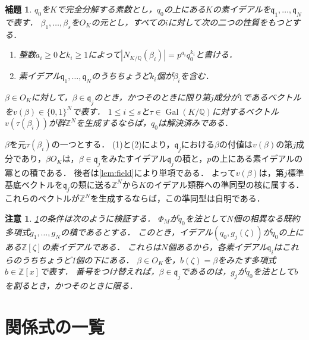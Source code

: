 \documentclass[11pt,a4paper]{ltjsarticle}
\makeatletter
\theoremstyle{ja}
\newtheorem{lemma}[theorem]{補題}
\newtheorem{remark}[theorem]{注意}
\renewenvironment{proof}[1][証明]{\par
  \pushQED{\qed}\normalfont \topsep6\p@\@plus6\p@\relax
  \trivlist
  \item[\hskip\labelsep\bfseries #1]\hspace{1\zw}\ignorespaces
}{\popQED\endtrivlist\@endpefalse}
\makeatother
\begin{document}
\begin{lemma} \label{lem:block}
$q_0$を$K$で完全分解する素数とし，$q_0$の上にある$K$の素イデアルを$\mathfrak{q}_1, \ldots, \mathfrak{q}_N$で表す．
$\beta_1, \ldots, \beta_s$を$O_K$の元とし，すべての$i$に対して次の二つの性質をもつとする．
\begin{enumerate}
\item 整数$a_i \ge 0$と$k_i \ge 1$によって$|N_{K/\mathbb{Q}}(\beta_i)| = p^{a_i} q_0^{k_i}$と書ける．
\item 素イデアル$\mathfrak{q}_1, \ldots, \mathfrak{q}_N$のうちちょうど$k_i$個が$\beta_i$を含む．
\end{enumerate}
$\beta \in O_K$に対して，$\beta \in \mathfrak{q}_j$のとき，かつそのときに限り第$j$成分が$1$であるベクトルを$v(\beta) \in \{0,1\}^N$で表す．
$1 \le i \le s$と$\tau \in \operatorname{Gal}(K/\mathbb{Q})$に対するベクトル$v(\tau(\beta_i))$が群$\mathbb{Z}^N$を生成するならば，$q_0$は解決済みである．
\end{lemma}

\begin{proof}
$\beta$を元$\tau(\beta_i)$の一つとする．
(1)と(2)により，$\mathfrak{q}_j$における$\beta$の付値は$v(\beta)$の第$j$成分であり，$\beta O_K$は，$\beta \in \mathfrak{q}_j$をみたすイデアル$\mathfrak{q}_j$の積と，$p$の上にある素イデアルの冪との積である．
後者は\cref{lem:field}により単項である．
よって$v(\beta)$は，第$j$標準基底ベクトルを$\mathfrak{q}_j$の類に送る$\mathbb{Z}^N$から$K$のイデアル類群への準同型の核に属する．
これらのベクトルが$\mathbb{Z}^N$を生成するならば，この準同型は自明である．
\end{proof}

\begin{remark} \label{rem:blockcheck}
\cref{lem:block}の条件は次のように検証する．
$\Phi_M$が$q_0$を法として$N$個の相異なる既約多項式$g_1, \ldots, g_N$の積であるとする．
このとき，イデアル$(q_0, g_j(\zeta))$が$q_0$の上にある$\mathbb{Z}[\zeta]$の素イデアルである．
これらは$N$個あるから，各素イデアル$\mathfrak{q}_i$はこれらのうちちょうど1個の下にある．
$\beta \in O_K$を，$b(\zeta) = \beta$をみたす多項式$b \in \mathbb{Z}[x]$で表す．
番号をつけ替えれば，$\beta \in \mathfrak{q}_j$であるのは，$g_j$が$q_0$を法として$b$を割るとき，かつそのときに限る．
\end{remark}

\section{関係式の一覧} \label{sec:data}
\end{document}
